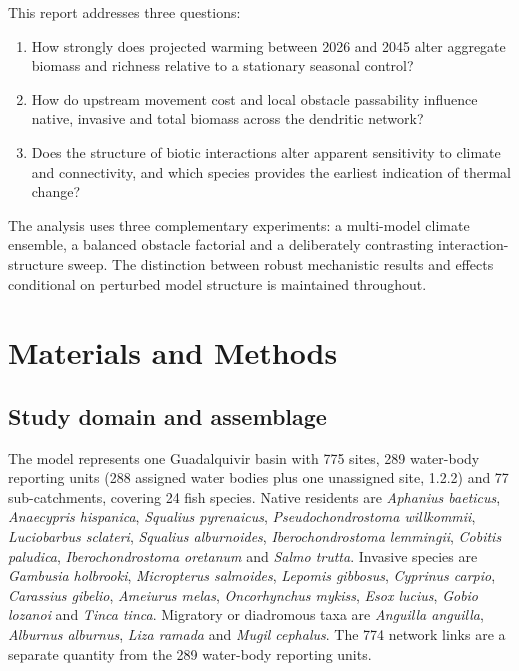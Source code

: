 \documentclass[11pt,a4paper]{article}
\begin{document}
This report addresses three questions:

\begin{enumerate}
    \item How strongly does projected warming between 2026 and 2045 alter aggregate biomass and richness relative to a stationary seasonal control?
    \item How do upstream movement cost and local obstacle passability influence native, invasive and total biomass across the dendritic network?
    \item Does the structure of biotic interactions alter apparent sensitivity to climate and connectivity, and which species provides the earliest indication of thermal change?
\end{enumerate}

The analysis uses three complementary experiments: a multi-model climate ensemble, a balanced obstacle factorial and a deliberately contrasting interaction-structure sweep. The distinction between robust mechanistic results and effects conditional on perturbed model structure is maintained throughout.

\section{Materials and Methods}

\subsection{Study domain and assemblage}

The model represents one Guadalquivir basin with 775 sites, 289 water-body reporting units (288 assigned water bodies plus one unassigned site, 1.2.2) and 77 sub-catchments, covering 24 fish species. Native residents are \textit{Aphanius baeticus}, \textit{Anaecypris hispanica}, \textit{Squalius pyrenaicus}, \textit{Pseudochondrostoma willkommii}, \textit{Luciobarbus sclateri}, \textit{Squalius alburnoides}, \textit{Iberochondrostoma lemmingii}, \textit{Cobitis paludica}, \textit{Iberochondrostoma oretanum} and \textit{Salmo trutta}. Invasive species are \textit{Gambusia holbrooki}, \textit{Micropterus salmoides}, \textit{Lepomis gibbosus}, \textit{Cyprinus carpio}, \textit{Carassius gibelio}, \textit{Ameiurus melas}, \textit{Oncorhynchus mykiss}, \textit{Esox lucius}, \textit{Gobio lozanoi} and \textit{Tinca tinca}. Migratory or diadromous taxa are \textit{Anguilla anguilla}, \textit{Alburnus alburnus}, \textit{Liza ramada} and \textit{Mugil cephalus}. The 774 network links are a separate quantity from the 289 water-body reporting units.
\end{document}
